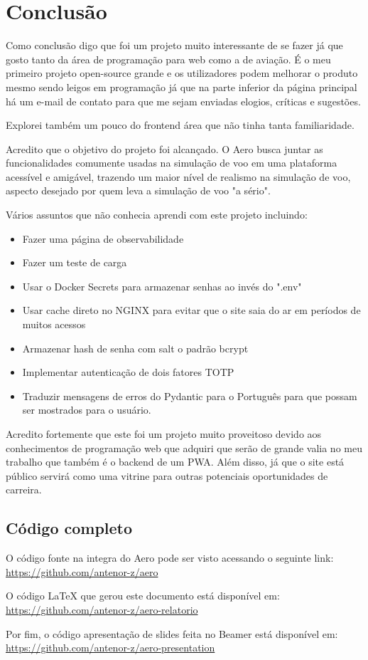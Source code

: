\chapter{Conclusão}

Como conclusão digo que foi um projeto muito interessante de se fazer já que 
gosto tanto da área de programação para web como a de aviação. É o meu primeiro 
projeto open-source grande e os utilizadores podem melhorar o produto mesmo sendo
leigos em programação já que na parte inferior da página principal há um e-mail 
de contato para que me sejam enviadas elogios, críticas e sugestões.

Explorei também um pouco do frontend área que não tinha tanta familiaridade.

Acredito que o objetivo do projeto foi alcançado. O Aero busca juntar as funcionalidades 
comumente usadas na simulação de voo em uma plataforma acessível e amigável, 
trazendo um maior nível de realismo na simulação de voo, aspecto desejado por quem leva
a simulação de voo "a sério".

Vários assuntos que não conhecia aprendi com este projeto incluindo:

\begin{itemize}
\item Fazer uma página de observabilidade
\item Fazer um teste de carga
\item Usar o Docker Secrets para armazenar senhas ao invés do ".env"
\item Usar cache direto no NGINX para evitar que o site saia do ar em períodos 
de muitos acessos
\item Armazenar hash de senha com salt o padrão bcrypt
\item Implementar autenticação de dois fatores TOTP
\item Traduzir mensagens de erros do Pydantic para o Português para que possam 
ser mostrados para o usuário.
\end{itemize}

Acredito fortemente que este foi um projeto muito proveitoso devido aos 
conhecimentos de programação web que adquiri que serão de grande valia no meu 
trabalho que também é o backend de um PWA. Além disso, já que o site está público 
servirá como uma vitrine para outras potenciais oportunidades de carreira.

\section {Código completo}

O código fonte na integra do Aero pode ser visto acessando o seguinte link: \url{https://github.com/antenor-z/aero}

O código LaTeX que gerou este documento está disponível em: \url{https://github.com/antenor-z/aero-relatorio}

Por fim, o código apresentação de slides feita no Beamer está disponível em: \url{https://github.com/antenor-z/aero-presentation}